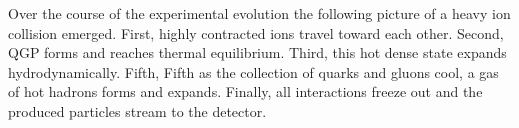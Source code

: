       Over the course of the experimental evolution the following picture of 
        a heavy ion collision emerged. 
      First, highly contracted ions travel toward each other.
      Second, QGP forms and reaches thermal equilibrium.
      Third, this hot dense state expands hydrodynamically.
      Fifth, Fifth as the collection of quarks and gluons cool, a gas of hot
        hadrons forms and expands.
      Finally, all interactions freeze out and the produced particles stream 
        to the detector. 
